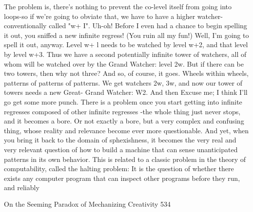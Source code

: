          The problem is, there's nothing to prevent the co-level itself from going into
loops-so if we're going to obviate that, we have to have a higher watcher-
conventionally called "w+ I". Uh-oh! Before I even had a chance to begin spelling it
out, you sniffed a new infinite regress! (You ruin all my fun!) Well, I'm going to spell
it out, anyway. Level w+ l needs to be watched by level w+2, and that level by level
w+3. Thus we have a second potentially infinite tower of watchers, all of whom will
be watched over by the Grand Watcher: level 2w. But if there can be two towers, then
why not three? And so, of course, it goes. Wheels within wheels, patterns of patterns
of patterns. We get watchers 2w, 3w, and now our tower of towers needs a new Great-
Grand Watcher: W2. And then
         Excuse me; I think I'll go get some more punch. There is a problem once you
start getting into infinite regresses composed of other infinite regresses -the whole
thing just never stops, and it becomes a bore. Or not exactly a bore, but a very
complex and confusing thing, whose reality and relevance become ever more
questionable. And yet, when you bring it back to the domain of sphexishness, it
becomes the very real and very relevant question of how to build a machine that can
sense unanticipated patterns in its own behavior.
         This is related to a classic problem in the theory of computability, called the
halting problem: It is the question of whether there exists any computer program that
can inspect other programs before they run, and reliably




On the Seeming Paradox of Mechanizing Creativity                                      534

